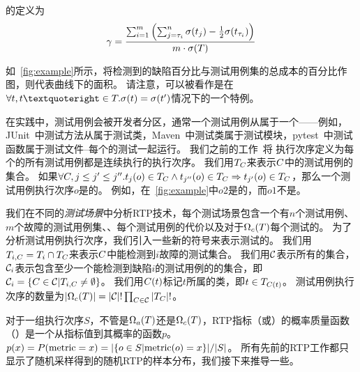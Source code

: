 \begin{mydefinition}[\APFDc]
\APFDcFull{}的定义为
\begin{equation}\label{definition_apfdc}
    \mathrm{\gamma}=\frac{\sum_{i=1}^m\left(\sum_{j=\tau_i}^n\sigma(t_j)-\frac{1}{2}\sigma(t_{\tau_i})\right)}{m\cdot \sigma(T)}
\end{equation}
\end{mydefinition}

如\Figure~\ref{fig:example}所示，将检测到的缺陷百分比与测试用例集的总成本的百分比作图，\APFDc{}则代表曲线下的面积。
请注意，\APFD{}可以被看作是\APFDc{}在$\forall t,t’\in T.\Cost{t}=\Cost{t'}$情况下的一个特例。

在实践中，测试用例会被开发者分区，通常一个测试用例从属于一个\emph{\classes}——例如，JUnit~\cite{2021JUnit}中测试方法从属于测试类，Maven~\cite{2020Maven}中测试类属于测试模块，pytest~\cite{2021pytest}中测试函数属于测试文件--每个\class{}的测试一起运行。
我们之前的工作~\cite{wei2021probabilistic}将 \emph{\compatible{}}执行次序定义为每个\class{}的所有测试用例都是连续执行的执行次序。
我们用$T_C$来表示$C$\class{}中的测试用例的集合。
如果$\forall C,j\le j'\le j''.t_{j}(o)\in T_C\wedge t_{j''}(o)\in T_C\Rightarrow t_{j'}(o)\in T_C$，那么一个测试用例执行次序$o$是\compatible{}的。
例如，在\Figure~\ref{fig:example}中$o2$是\compatible{}的，而$o1$不是。

我们在不同的\emph{测试场景}中分析RTP技术，每个测试场景包含一个有$n$个测试用例、$m$个故障的测试用例集、\mappingMatrix{}、每个测试用例的代价以及对于$\Omega_c(T)$每个测试的\class{}。
为了分析\compatible{}测试用例执行次序，我们引入一些新的符号来表示测试的\class{}。
我们用$T_{i,C}=T_i\cap T_C$来表示$C$\class{}中能检测到$i$故障的测试集合。
我们用$\mathcal{C}$表示所有\class{}的集合，$\mathcal{C}_i$表示包含至少一个能检测到缺陷$i$的测试用例的\class{}的集合，即$\mathcal{C}_i=\{C\in \mathcal{C}| T_{i,C}\ne \emptyset\}$。
我们用$C(t)$标记$t$所属的类，即$t\in T_{C(t)}$。
\compatible{}测试用例执行次序的数量为$|\Omega_c(T)|=|\mathcal{C}|!\prod_{C\in \mathcal{C}}|T_C|!$。

对于一组执行次序$S$，不管是$\Omega_a(T)$还是$\Omega_c(T)$，RTP指标（\APFD{}或\APFDc{}）的概率质量函数（\distribution{}）是一个从指标值到其概率的函数$p$。$p(x)=P(\mathrm{metric}=x)=|\{o\in S|\mathrm{metric}(o)=x\}|/|S|$。
所有先前的RTP工作都只显示了随机采样得到的随机RTP的样本分布，我们接下来推导一些\distributions{}。